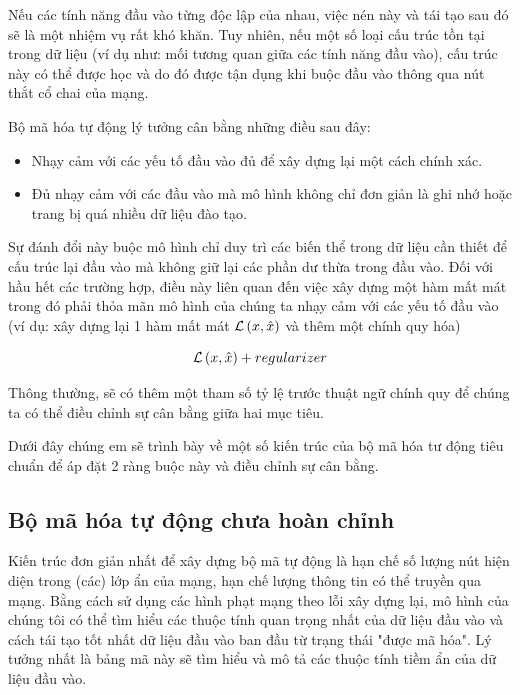 \newpage
Nếu các tính năng đầu vào từng độc lập của nhau, việc nén này và tái tạo sau đó sẽ là
một nhiệm vụ rất khó khăn. Tuy nhiên, nếu một số loại cấu trúc tồn tại trong dữ liệu
(ví dụ như: mối tương quan giữa các tính năng đầu vào), cấu trúc này có thể được
học và do đó được tận dụng khi buộc đầu vào thông qua nút thắt cổ chai của mạng.

Bộ mã hóa tự động lý tưởng cân bằng những điều sau đây:
\begin{itemize}[leftmargin=1.5cm]
    \item Nhạy cảm với các yếu tố đầu vào đủ để xây dựng lại một cách chính xác.
    \item Đủ nhạy cảm với các đầu vào mà mô hình không chỉ đơn giản là ghi
          nhớ hoặc trang bị quá nhiều dữ liệu đào tạo.
\end{itemize}

\newpage
Sự đánh đổi này buộc mô hình chỉ duy trì các biến thể trong dữ liệu cần
thiết để cấu trúc lại đầu vào mà không giữ lại các phần dư thừa trong đầu vào.
Đối với hầu hết các trường hợp, điều này liên quan đến việc xây dựng một hàm mất mát
trong đó phải thỏa mãn mô hình của chúng ta nhạy cảm với các yếu tố đầu vào
(ví dụ: xây dựng lại 1 hàm mất mát ${\cal L}\left( {x,\hat x} \right)$ và
thêm một chính quy hóa)


\begin{equation}
    {\cal L}\left( {x,\hat x} \right) + regularizer
\end{equation}

Thông thường, sẽ có thêm một tham số tỷ lệ trước thuật ngữ chính quy để chúng ta
có thể điều chỉnh sự cân bằng giữa hai mục tiêu.

Dưới đây chúng em sẽ trình bày về một số kiến trúc của bộ mã hóa tư động
tiêu chuẩn để áp đặt 2 ràng buộc này và điều chỉnh sự cân bằng.



\subsection{Bộ mã hóa tự động chưa hoàn chỉnh}

Kiến trúc đơn giản nhất để xây dựng bộ mã tự động là hạn chế số lượng
nút hiện diện trong (các) lớp ẩn của mạng, hạn chế lượng thông tin có
thể truyền qua mạng. Bằng cách sử dụng các hình phạt mạng theo lỗi xây dựng lại,
mô hình của chúng tôi có thể tìm hiểu các thuộc tính quan trọng nhất của dữ
liệu đầu vào và cách tái tạo tốt nhất dữ liệu đầu vào ban đầu từ trạng thái
"được mã hóa". Lý tưởng nhất là bảng mã này sẽ tìm hiểu và mô tả các thuộc
tính tiềm ẩn của dữ liệu đầu vào.

